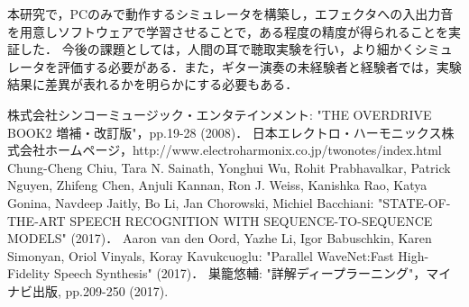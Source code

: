 \documentclass{jreport}		%
\begin{document}
本研究で，PCのみで動作するシミュレータを構築し，エフェクタへの入出力音を用意しソフトウェアで学習させることで，ある程度の精度が得られることを実証した．
今後の課題としては，人間の耳で聴取実験を行い，より細かくシミュレータを評価する必要がある．また，ギター演奏の未経験者と経験者では，実験結果に差異が表れるかを明らかにする必要もある．

\begin{thebibliography}{3}
   株式会社シンコーミュージック・エンタテインメント: "THE OVERDRIVE BOOK2 増補・改訂版"，pp.19-28 (2008)．
   日本エレクトロ・ハーモニックス株式会社ホームページ，http://www.electroharmonix.co.jp/twonotes/index.html
   Chung-Cheng Chiu, Tara N. Sainath, Yonghui Wu, Rohit Prabhavalkar, Patrick Nguyen, Zhifeng Chen, Anjuli Kannan, Ron J. Weiss, Kanishka Rao, Katya Gonina, Navdeep Jaitly, Bo Li, Jan Chorowski, Michiel Bacchiani: "STATE-OF-THE-ART SPEECH RECOGNITION WITH SEQUENCE-TO-SEQUENCE MODELS" (2017)．
   Aaron van den Oord, Yazhe Li, Igor Babuschkin, Karen Simonyan, Oriol Vinyals, Koray Kavukcuoglu: "Parallel WaveNet:Fast High-Fidelity Speech Synthesis" (2017)．
   巣籠悠輔: "詳解ディープラーニング"，マイナビ出版, pp.209-250 (2017).
\end{thebibliography}
\end{document}
